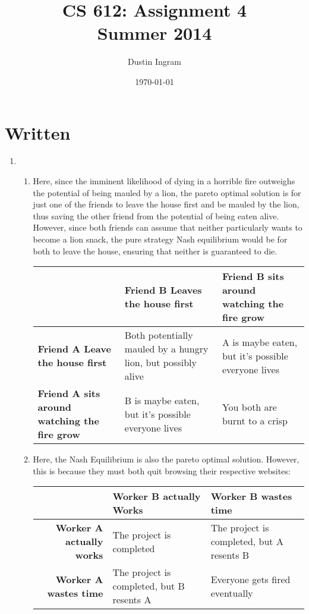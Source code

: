 \documentclass{article}
\title{CS 612: Assignment 4\\Summer 2014}
\author{Dustin Ingram}
\date{\today}
\begin{document}
\maketitle

\section*{Written}


\begin{enumerate}

\item{} %

\begin{enumerate}

\item{} %

Here, since the imminent likelihood of dying in a horrible fire outweighs the potential of being mauled by a lion, the pareto optimal solution is for just one of the friends to leave the house first and be mauled by the lion, thus saving the other friend from the potential of being eaten alive. However, since both friends can assume that neither particularly wants to become a lion snack, the pure strategy Nash equilibrium would be for both to leave the house, ensuring that neither is guaranteed to die.

\begin{center}
\begin{tabular}{ p{3cm} || p{3cm} | p{3cm} }
    & \textbf{Friend B Leaves the house first} & \textbf{Friend B sits around watching the fire grow} \\ \hline \hline
  \textbf{Friend A Leave the house first} & Both potentially mauled by a hungry lion, but possibly alive & A is maybe eaten, but it's possible everyone lives\\ \hline
  \textbf{Friend A sits around watching the fire grow} & B is maybe eaten, but it's possible everyone lives & You both are burnt to a crisp\\
\end{tabular}
\end{center}

\item{} %

Here, the Nash Equilibrium is also the pareto optimal solution. However, this is because they must both quit browsing their respective websites:

\begin{center}
  \begin{tabular}{ r || p{3cm} | p{3cm} }
      & \textbf{Worker B actually Works} & \textbf{Worker B wastes time} \\ \hline \hline
    \textbf{Worker A actually works} & The project is completed & The project is completed, but A resents B \\ \hline
    \textbf{Worker A wastes time} & The project is completed, but B resents A & Everyone gets fired eventually \\
  \end{tabular}
\end{center}


\end{enumerate}
\end{enumerate}
\end{document}
